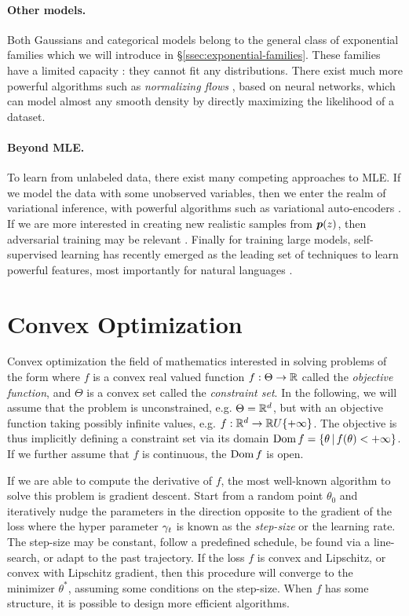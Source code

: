 \paragraph{Other models.}
Both Gaussians and categorical models belong to the general class of exponential families which we will introduce in \S\ref{ssec:exponential-families}.
These families have a limited capacity : they cannot fit any distributions.
There exist much more powerful algorithms such as \emph{normalizing flows} \citep{rezende2015variational}, based on neural networks, which can model almost any smooth density by directly maximizing the likelihood of a dataset.

\paragraph{Beyond MLE.} 
To learn from unlabeled data, there exist many competing approaches to MLE. 
If we model the data with some unobserved variables, then we enter the realm of variational inference, with powerful algorithms such as variational auto-encoders \citep{kingma2013auto}. 
If we are more interested in creating new realistic samples from $\bm{p}(z)$, then adversarial training may be relevant \citep{goodfellow2014generative}.
Finally for training large models, self-supervised learning has recently emerged as the leading set of techniques to learn powerful features, most importantly for natural languages \citep{peters2018deep,devlin2018bert}.


\section{Convex Optimization}
Convex optimization the field of mathematics interested in solving problems of the form
where $f$ is a convex real valued function $f:\Theta \rightarrow \mathbb{R}$ called the \emph{objective function}, and $\Theta$ is a convex set called the \emph{constraint set}.
In the following, we will assume that the problem is unconstrained, e.g. $\Theta = \mathbb{R}^d$, 
but with an objective function taking possibly infinite values, e.g. $f : \mathbb{R}^d \rightarrow \mathbb{R} U \{+\infty\}$. %
The objective is thus implicitly defining a constraint set via its domain $\operatorname{\mathrm{Dom}} f = \{ \theta \,\vert\, f(\theta) < +\infty \}$.
If we further assume that $f$ is continuous, the $\operatorname{\mathrm{Dom}} f$ is open. 

If we are able to compute the derivative of $f$, the most well-known algorithm to solve this problem is gradient descent. 
Start from a random point $\theta_0$ and iteratively nudge the parameters in the direction opposite to the gradient of the loss
where the hyper parameter $\gamma_t$ is known as the \emph{step-size} or the learning rate. The step-size may be constant, follow a predefined schedule, be found via a line-search, or adapt to the past trajectory.
If the loss  $f$ is convex and Lipschitz, or convex with Lipschitz gradient, then this procedure will converge to the minimizer $\theta^*$, assuming some conditions on the step-size. When $f$ has some structure, it is possible to design more efficient algorithms.

